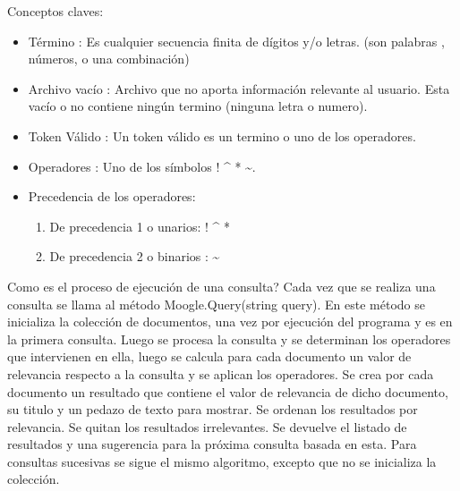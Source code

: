 \documentclass{article}
\begin{document}
Conceptos claves: 
\begin{itemize}
  \item Término : Es cualquier secuencia finita de dígitos y/o letras. (son palabras , números, o una combinación)
  \item Archivo vacío : Archivo que no aporta información relevante al usuario. Esta vacío o no contiene ningún termino (ninguna letra o numero).
  \item Token Válido : Un token válido es un termino o uno de los operadores.
  \item Operadores : Uno de los símbolos ! \^{} * \~{}.
  \item Precedencia de los operadores:
        \begin{enumerate}
          \item De precedencia 1 o unarios: ! \^{} *
          \item De precedencia 2 o binarios : \~{}
        \end{enumerate} 
\end{itemize}

Como es el proceso de ejecución de una consulta? Cada vez que se realiza una consulta se llama al método Moogle.Query(string query). En este método se inicializa la colección de documentos, una vez por ejecución del programa y es en la primera consulta. Luego se procesa la consulta y se determinan los operadores que intervienen en ella, luego se calcula para cada documento un valor de relevancia respecto a la consulta y se aplican los operadores. Se crea por cada documento un resultado que contiene el valor de relevancia de dicho documento, su titulo y un pedazo de texto para mostrar. Se ordenan los resultados por relevancia. Se quitan los resultados irrelevantes. Se devuelve el listado de resultados y una sugerencia para la próxima consulta basada en esta. Para consultas sucesivas se sigue el mismo algoritmo, excepto que no se inicializa la colección.
\end{document}
